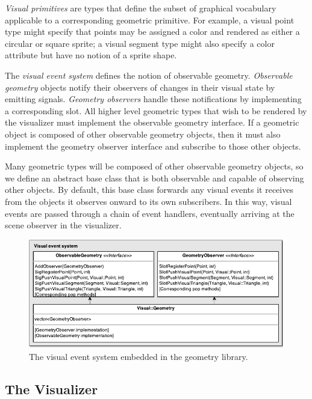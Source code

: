 \emph{Visual primitives} are types that define the subset of graphical
vocabulary applicable to a corresponding geometric primitive. For
example, a visual point type might specify that points may be assigned a color
and rendered as either a circular or square sprite; a visual segment type might
also specify a color attribute but have no notion of a sprite shape.

The \emph{visual event system} defines the notion of observable geometry.
\emph{Observable geometry} objects notify their observers of changes in their
visual state by emitting signals. \emph{Geometry observers} handle these
notifications by implementing a corresponding slot. All higher level geometric
types that wish to be rendered by the visualizer must implement the observable
geometry interface. If a geometric object is composed of other observable
geometry objects, then it must also implement the geometry observer interface
and subscribe to those other objects.

Many geometric types will be composed of other observable geometry objects, so
we define an abstract base class that is both observable and capable of
observing other objects. By default, this base class forwards any visual events
it receives from the objects it observes onward to its own subscribers. In this
way, visual events are passed through a chain of event handlers, eventually
arriving at the scene observer in the visualizer.

\begin{figure}[htb]
\centering
\includegraphics[width=\textwidth]{figures/visual-uml-6} 
\caption{The visual event system embedded in the geometry library.}
\label{fig:visual} 
\end{figure} 

\FloatBarrier
\subsection{The Visualizer}

